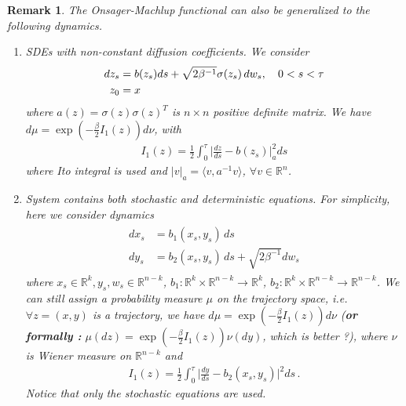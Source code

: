 \documentclass[final]{siamltex}
\newtheorem{remark}{Remark}
\begin{document}
\begin{remark}
  \label{remark-general}
  The Onsager-Machlup functional can also be generalized to the following dynamics.
  \begin{enumerate}
    \item
      SDEs with non-constant diffusion coefficients. We consider 
      \begin{align}
	\vspace{-9mm}
    \begin{split}
      d z_s &= b(z_s) ds + \sqrt{2\beta^{-1}} \sigma(z_s)\,dw_s, \quad 0 < s < \tau \\
      z_0&=x
    \end{split}
    \label{dynamics-1-sigma}
    \end{align}
    where $a(z) = \sigma(z)\sigma(z)^T$ is $n \times n$ positive definite matrix. We have 
    $d\mu = \exp(-\frac{\beta}{2} I_1(z)) d\nu$, with 
    \begin{align*}
      I_1(z) = \frac{1}{2} \int_0^\tau \Big|\frac{dz}{ds} - b(z_s)\Big|_a^2 ds
    \end{align*}
     where Ito integral is used and $|v|_a = \langle v, a^{-1}v\rangle$,
     $\forall v \in \mathbb{R}^n$.
    \item
      System contains both stochastic and deterministic equations. For
      simplicity, here we consider dynamics 
      \begin{align}
      \begin{split}
	dx_s & = b_1(x_s, y_s)\, ds \\
	dy_s & = b_2(x_s, y_s)\, ds + \sqrt{2\beta^{-1}} dw_s
      \end{split}
      \label{ode-sde}
      \end{align}
      where $x_s \in \mathbb{R}^k, y_s, w_s \in \mathbb{R}^{n-k}$, $b_1 :
      \mathbb{R}^k \times \mathbb{R}^{n-k} \rightarrow \mathbb{R}^k$, $b_2 :
      \mathbb{R}^k \times \mathbb{R}^{n-k} \rightarrow
      \mathbb{R}^{n-k}$. We can still assign a probability measure $\mu$ on the
      trajectory space, i.e. $\forall z = (x,y) $ is a trajectory, we have 
      $d\mu = \exp(-\frac{\beta}{2} I_1(z)) d\nu$ (\textbf{or formally :}  $\mu(dz) =
      \exp(-\frac{\beta}{2} I_1(z)) \nu(dy)$, which is better ?), where $\nu$ is Wiener
      measure on $\mathbb{R}^{n-k}$ and 
      \begin{align*}
	I_1(z) = \frac{1}{2} \int_0^\tau \Big|\frac{dy}{ds} - b_2(x_s, y_s)
	\Big|^2 ds\,.
      \end{align*}
      Notice that only the stochastic equations are used.
  \end{enumerate}
\end{remark}
\end{document}
